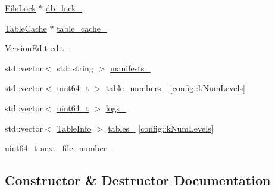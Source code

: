 \begin{DoxyCompactItemize}
\item 
\hyperlink{classleveldb_1_1_file_lock}{File\+Lock} $\ast$ \hyperlink{classleveldb_1_1anonymous__namespace_02repair_8cc_03_1_1_repairer_a6fe6e1a90a4348661a2ba4fbc86165f2}{db\+\_\+lock\+\_\+}
\item 
\hyperlink{classleveldb_1_1_table_cache}{Table\+Cache} $\ast$ \hyperlink{classleveldb_1_1anonymous__namespace_02repair_8cc_03_1_1_repairer_a1f4b3c1f0496622b0c551603293a7604}{table\+\_\+cache\+\_\+}
\item 
\hyperlink{classleveldb_1_1_version_edit}{Version\+Edit} \hyperlink{classleveldb_1_1anonymous__namespace_02repair_8cc_03_1_1_repairer_adbeacef6672c5fd48575175b9efd943f}{edit\+\_\+}
\item 
std\+::vector$<$ std\+::string $>$ \hyperlink{classleveldb_1_1anonymous__namespace_02repair_8cc_03_1_1_repairer_a20f7bba4bcbf1db18256dc20755ec225}{manifests\+\_\+}
\item 
std\+::vector$<$ \hyperlink{stdint_8h_aaa5d1cd013383c889537491c3cfd9aad}{uint64\+\_\+t} $>$ \hyperlink{classleveldb_1_1anonymous__namespace_02repair_8cc_03_1_1_repairer_a1804cc3ae7d3bf5e49c0bdabcc8a9934}{table\+\_\+numbers\+\_\+} \mbox{[}\hyperlink{namespaceleveldb_1_1config_ab6017947ae68898c606643bddc0f5b9c}{config\+::k\+Num\+Levels}\mbox{]}
\item 
std\+::vector$<$ \hyperlink{stdint_8h_aaa5d1cd013383c889537491c3cfd9aad}{uint64\+\_\+t} $>$ \hyperlink{classleveldb_1_1anonymous__namespace_02repair_8cc_03_1_1_repairer_afb5e4ff1c21d601ed46fa4bab65de8e9}{logs\+\_\+}
\item 
std\+::vector$<$ \hyperlink{structleveldb_1_1anonymous__namespace_02repair_8cc_03_1_1_repairer_1_1_table_info}{Table\+Info} $>$ \hyperlink{classleveldb_1_1anonymous__namespace_02repair_8cc_03_1_1_repairer_abd7601c6bc61f6ce6a1d90959636fafb}{tables\+\_\+} \mbox{[}\hyperlink{namespaceleveldb_1_1config_ab6017947ae68898c606643bddc0f5b9c}{config\+::k\+Num\+Levels}\mbox{]}
\item 
\hyperlink{stdint_8h_aaa5d1cd013383c889537491c3cfd9aad}{uint64\+\_\+t} \hyperlink{classleveldb_1_1anonymous__namespace_02repair_8cc_03_1_1_repairer_a746dff307c4a30ac6d2ab6011807e83a}{next\+\_\+file\+\_\+number\+\_\+}
\end{DoxyCompactItemize}


\subsection{Constructor \& Destructor Documentation}
\hypertarget{classleveldb_1_1anonymous__namespace_02repair_8cc_03_1_1_repairer_a40e11b36cb2e900f1d14b0e5b661c23f}{}
